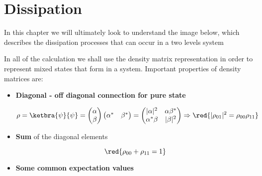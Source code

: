 \section{Dissipation\label{sec:linbland1}}
 In this chapter we will ultimately look to understand the image below, which describes the dissipation processes that can occur in a two levels system
 
 \begin{figure}[h]
 \end{figure}

 In all of the calculation we shall use the density matrix representation in order to represent mixed states that form in a system. Important properties of density matrices are:
 
 \begin{itemize}
 	\item \textbf{Diagonal - off diagonal connection for pure state}
 	
 	\begin{equation}\label{dOffD}
 		\rho=\ketbra{\psi}{\psi} = \begin{pmatrix}
 			\alpha\\\beta
 		\end{pmatrix}\begin{pmatrix}
 			\alpha^{*}&\beta^{*}
 		\end{pmatrix} = \begin{pmatrix}
	 		|\alpha|^2&\alpha\beta^{*}\\\alpha^{*}\beta&|\beta|^2
 		\end{pmatrix} \Rightarrow \red{|\rho_{01}|^2 = \rho_{00}\rho_{11}}
 	\end{equation}
 	\item \textbf{Sum} of the diagonal elements
 	
 	\begin{equation}\label{sum}
 		\red{\rho_{00}+\rho_{11}=1}
 	\end{equation}
 	\item \textbf{Some common expectation values}
 	

\end{itemize}
